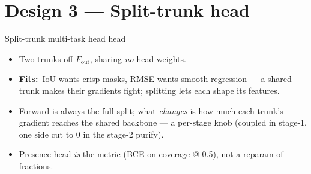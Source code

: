 \documentclass[aspectratio=169,11pt]{beamer}
\newcommand{\fit}{\textcolor{cHead}{\textbf{Fits:}}\ }
\begin{document}
\section{Design 3 --- Split-trunk head}

\begin{frame}{Split-trunk multi-task head \hfill\small\textcolor{cHead}{head}}
  \begin{center}
  \end{center}
  \begin{itemize}
    \item Two trunks off $F_{\text{out}}$, sharing \emph{no} head weights.
    \item \fit IoU wants crisp masks, RMSE wants smooth regression --- a shared
      trunk makes their gradients fight; splitting lets each shape its features.
    \item Forward is always the full split; what \emph{changes} is how much each
      trunk's gradient reaches the shared backbone --- a per-stage knob (coupled in
      stage-1, one side cut to 0 in the stage-2 purify).
    \item Presence head \emph{is} the metric (BCE on coverage @ 0.5), not a
      reparam of fractions.
  \end{itemize}
\end{frame}
\end{document}
